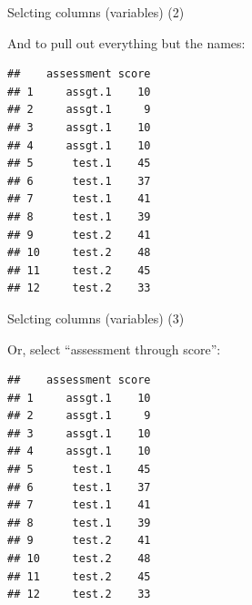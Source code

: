 \begin{frame}[fragile]{Selcting columns (variables) (2)}
  
  And to pull out everything but the names:
  
\begin{knitrout}
\color{fgcolor}\begin{kframe}
\begin{alltt}
\hlopt{-}
\end{alltt}
\begin{verbatim}
##    assessment score
## 1     assgt.1    10
## 2     assgt.1     9
## 3     assgt.1    10
## 4     assgt.1    10
## 5      test.1    45
## 6      test.1    37
## 7      test.1    41
## 8      test.1    39
## 9      test.2    41
## 10     test.2    48
## 11     test.2    45
## 12     test.2    33
\end{verbatim}
\end{kframe}
\end{knitrout}
  
\end{frame}

\begin{frame}[fragile]{Selcting columns (variables) (3)}
  
Or, select ``assessment through score'':
  
\begin{knitrout}
\color{fgcolor}\begin{kframe}
\begin{alltt}
\hlopt{:}
\end{alltt}
\begin{verbatim}
##    assessment score
## 1     assgt.1    10
## 2     assgt.1     9
## 3     assgt.1    10
## 4     assgt.1    10
## 5      test.1    45
## 6      test.1    37
## 7      test.1    41
## 8      test.1    39
## 9      test.2    41
## 10     test.2    48
## 11     test.2    45
## 12     test.2    33
\end{verbatim}
\end{kframe}
\end{knitrout}
  
\end{frame}

